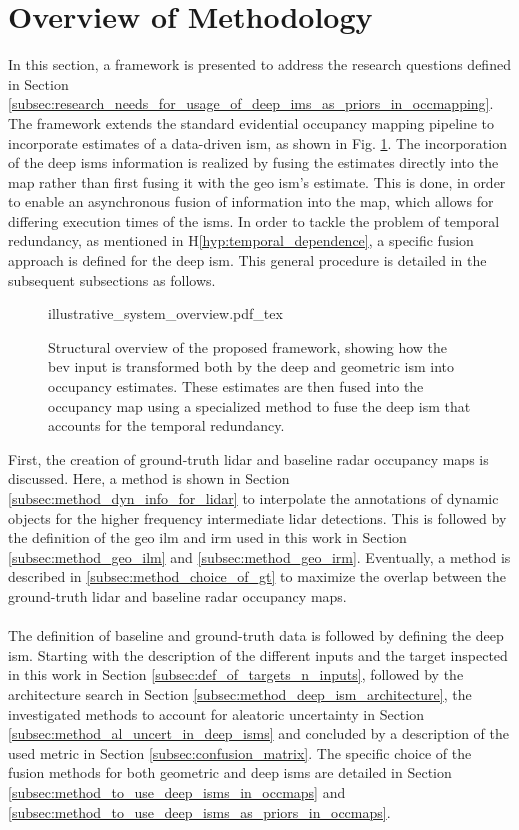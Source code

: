 \section{Overview of Methodology}
\label{sec:framework_overview}
In this section, a framework is presented to address the research questions defined in Section \ref{subsec:research_needs_for_usage_of_deep_ims_as_priors_in_occmapping}. The framework extends the standard evidential occupancy mapping pipeline \cite{pagac1996evidential} to incorporate estimates of a data-driven \gls{ism}, as shown in Fig. \ref{fig:illustrative_system_overview}. The incorporation of the deep \gls{ism}s information is realized by fusing the estimates directly into the map rather than first fusing it with the geo \gls{ism}'s estimate. This is done, in order to enable an asynchronous fusion of information into the map, which allows for differing execution times of the \gls{ism}s. In order to tackle the problem of temporal redundancy, as mentioned in H\ref{hyp:temporal_dependence}, a specific fusion approach is defined for the deep \gls{ism}. This general procedure is detailed in the subsequent subsections as follows.
%
\begin{figure}[H]
	\begin{center}
		{illustrative_system_overview.pdf_tex}
		\caption{\label{fig:illustrative_system_overview}Structural overview of the proposed framework, showing how the \gls{bev} input is transformed both by the deep and geometric \gls{ism} into occupancy estimates. These estimates are then fused into the occupancy map using a specialized method to fuse the deep \gls{ism} that accounts for the temporal redundancy.}
	\end{center}
\end{figure} 
First, the creation of ground-truth lidar and baseline radar occupancy maps is discussed. Here, a method is shown in Section \ref{subsec:method_dyn_info_for_lidar} to interpolate the annotations of dynamic objects for the higher frequency intermediate lidar detections. This is followed by the definition of the geo \gls{ilm} and \gls{irm} used in this work in Section \ref{subsec:method_geo_ilm} and \ref{subsec:method_geo_irm}. Eventually, a method is described in \ref{subsec:method_choice_of_gt} to maximize the overlap between the ground-truth lidar and baseline radar occupancy maps.
\\\\
The definition of baseline and ground-truth data is followed by defining the deep \gls{ism}. Starting with the description of the different inputs and the target inspected in this work in Section \ref{subsec:def_of_targets_n_inputs}, followed by the architecture search in Section \ref{subsec:method_deep_ism_architecture}, the investigated methods to account for aleatoric uncertainty in Section \ref{subsec:method_al_uncert_in_deep_isms} and concluded by a description of the used metric in Section \ref{subsec:confusion_matrix}. The specific choice of the fusion methods for both geometric and deep \gls{ism}s are detailed in Section \ref{subsec:method_to_use_deep_isms_in_occmaps} and \ref{subsec:method_to_use_deep_isms_as_priors_in_occmaps}.
%

